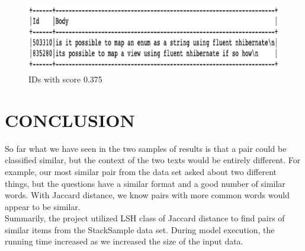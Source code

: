 \documentclass[12pt]{article}
\begin{document}
\begin{figure}[H]
	\includegraphics[scale=0.9]{sample2.png}
	\centering
	\caption{IDs with score 0.375}
	\label{fig:sample2}
\end{figure}
	\section{CONCLUSION}
	So far what we have seen in the two samples of results is that a pair could be classified similar, but the context of the two texts would be entirely different. For example, our most similar pair from the data set asked about two different things, but the questions have a similar format and a good number of similar words. With Jaccard distance, we know pairs with more common words would appear to be similar.
\\
	Summarily, the project utilized LSH class of Jaccard distance to find pairs of similar items from the StackSample data set. During model execution, the running time increased as we increased the size of the input data.
	
\end{document}
